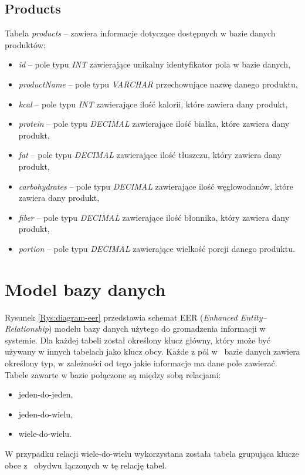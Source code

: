 \subsection{Products}
Tabela \textit{products} -- zawiera informacje dotyczące dostępnych w bazie danych produktów:
\begin{itemize}
	\item \textit{id} -- pole typu \textit{INT} zawierające unikalny identyfikator pola w bazie danych,
	\item \textit{productName} -- pole typu \textit{VARCHAR} przechowujące nazwę danego produktu,
	\item \textit{kcal} -- pole typu \textit{INT} zawierające ilość kalorii, które zawiera dany produkt,
	\item \textit{protein} -- pole typu \textit{DECIMAL} zawierające ilość białka, które zawiera dany produkt,
	\item \textit{fat} -- pole typu \textit{DECIMAL} zawierające ilość tłuszczu, który zawiera dany produkt,
	\item \textit{carbohydrates} -- pole typu \textit{DECIMAL} zawierające ilość węglowodanów, które zawiera dany produkt,
	\item \textit{fiber} -- pole typu \textit{DECIMAL} zawierające ilość błonnika, który zawiera dany produkt,
	\item \textit{portion} -- pole typu \textit{DECIMAL} zawierające wielkość porcji danego produktu.
\end{itemize}

\section{Model bazy danych}

Rysunek \ref{Rys:diagram-eer} przedstawia schemat EER (\textit{Enhanced Entity–Relationship}) modelu bazy danych użytego do gromadzenia informacji w systemie. Dla każdej tabeli został określony klucz główny, który może być używany w innych tabelach jako klucz obcy. Każde z pól w~ bazie danych zawiera określony typ, w zależności od tego jakie informacje ma dane pole zawierać. Tabele zawarte w bazie połączone są między sobą relacjami:
\begin{itemize}
	\item jeden-do-jeden,
	\item jeden-do-wielu,
	\item wiele-do-wielu.
\end{itemize}
W przypadku relacji wiele-do-wielu wykorzystana została tabela grupująca klucze obce z~ obydwu łączonych w tę relację tabel. 


